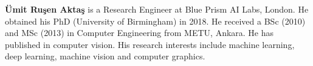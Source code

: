 \documentclass{ws-ijhr}
\begin{document}







\vspace*{-5pt}   %


\eject


\noindent%
\parbox{5truein}{
\begin{minipage}[b]{1truein}
\centerline{{}}
\end{minipage}
\hfill         %
\begin{minipage}[b]{3.85truein}
{{\bf \"{U}mit Ru\c{s}en Akta\c{s}} is a Research Engineer at Blue Prism AI Labs, London. He obtained his PhD (University of Birmingham) in 2018. He received a BSc (2010) and MSc (2013) in Computer Engineering from METU, Ankara. He has published in computer vision. His research interests include machine learning, deep learning, machine vision and computer graphics.\hfilneg}
\end{minipage}} %
\end{document}
